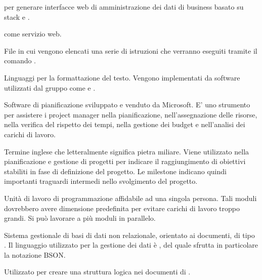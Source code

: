 \begin{itemize}


 per generare interfacce web di amministrazione dei dati di business basato su stack  e .


\ProjectName{} come servizio web.


File in cui vengono elencati una serie di istruzioni che verranno eseguiti tramite il comando .


Linguaggi per la formattazione del testo. Vengono implementati da software utilizzati dal gruppo come  e .


Software di pianificazione sviluppato e venduto da Microsoft. E'  uno strumento per assistere i project manager nella pianificazione, nell'assegnazione delle risorse, nella verifica del rispetto dei tempi, nella gestione dei budget e nell'analisi dei carichi di lavoro.


Termine inglese che letteralmente significa pietra miliare. Viene utilizzato nella pianificazione e gestione di progetti per indicare il raggiungimento di obiettivi stabiliti in fase di definizione del progetto. 
Le milestone indicano quindi importanti traguardi intermedi nello svolgimento del progetto.


Unità di lavoro di programmazione affidabile ad una singola persona. Tali moduli dovrebbero avere dimensione predefinita per evitare carichi di lavoro troppo grandi. Si può lavorare a più moduli in parallelo.


Sistema gestionale di basi di dati non relazionale, orientato ai documenti, di tipo . Il linguaggio utilizzato per la gestione dei dati è , del quale sfrutta in particolare la notazione BSON.


Utilizzato per creare una struttura logica nei documenti di .

\end{itemize}

